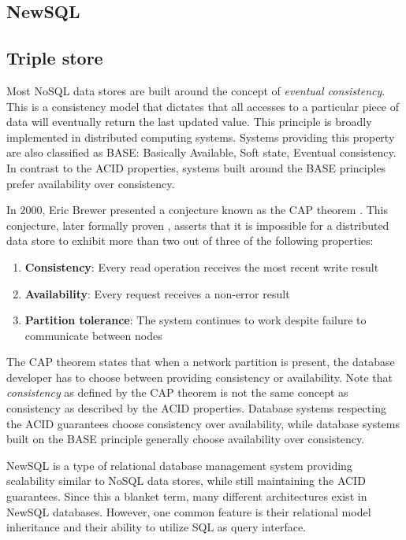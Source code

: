 \subsection{NewSQL}
\label{subsec:newsql}


\subsection{Triple store}
\label{subsec:triple-store}


Most NoSQL data stores are built around the concept of \textit{eventual consistency}.
This is a consistency model that dictates that all accesses to a particular piece of data will eventually return the last updated value.
This principle is broadly implemented in distributed computing systems.
Systems providing this property are also classified as BASE: Basically Available, Soft state, Eventual consistency.
In contrast to the ACID properties, systems built around the BASE principles prefer availability over consistency.

In 2000, Eric Brewer presented a conjecture known as the CAP theorem \autocite{Brewer2000}.
This conjecture, later formally proven \autocite{GilbertLynch2002}, asserts that it is impossible for a distributed data store to exhibit more than two out of three of the following properties:

\begin{enumerate}
  \item \textbf{Consistency}: Every read operation receives the most recent write result
  \item \textbf{Availability}: Every request receives a non-error result
  \item \textbf{Partition tolerance}: The system continues to work despite failure to communicate between nodes
\end{enumerate}

The CAP theorem states that when a network partition is present, the database developer has to choose between providing consistency or availability.
Note that \textit{consistency} as defined by the CAP theorem is not the same concept as consistency as described by the ACID properties.
Database systems respecting the ACID guarantees choose consistency over availability, while database systems built on the BASE principle generally choose availability over consistency.

NewSQL is a type of relational database management system providing scalability similar to NoSQL data stores, while still maintaining the ACID guarantees.
Since this a blanket term, many different architectures exist in NewSQL databases.
However, one common feature is their relational model inheritance and their ability to utilize SQL as query interface.
